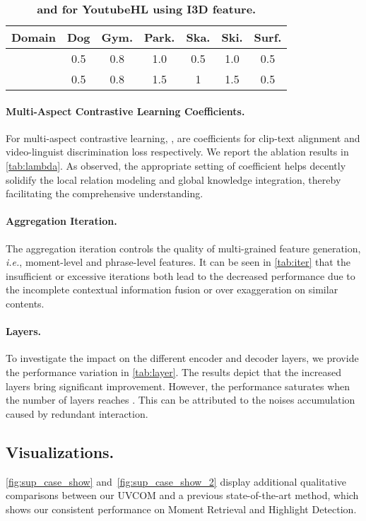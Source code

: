 \documentclass[10pt,twocolumn,letterpaper]{article}
\begin{document}
\begin{table*}[t]
\begin{minipage}[c]{\textwidth}
    \hspace{0.01\textwidth}
    \begin{minipage}{0.3\textwidth}
    \makeatletter{}
    \centering
    \footnotesize
    \vspace{10pt}
    \setlength{\tabcolsep}{2pt}
    \begin{tabular}{c | c c c c c c}
    \toprule
    Domain & Dog & Gym. & Park. & Ska. & Ski. & Surf. \\
    \midrule
     & 0.5 & 0.8 & 1.0 & 0.5 & 1.0 & 0.5 \\
    \midrule
     & 0.5 & 0.8 & 1.5 & 1 & 1.5 & 0.5 \\
    \bottomrule
    \end{tabular}
    \caption{\textbf{ and  for YoutubeHL using I3D feature.}}
    \label{tab:sup_youtubehl_i3d_loss}
    \end{minipage}
\end{minipage}
\end{table*} \paragraph{Multi-Aspect Contrastive Learning Coefficients.}
For multi-aspect contrastive learning, ,  are coefficients for clip-text alignment and video-linguist discrimination loss respectively. We report the ablation results in \cref{tab:lambda}. As observed, the appropriate setting of coefficient helps decently solidify the local relation modeling and global knowledge integration, thereby facilitating the comprehensive understanding. 

\paragraph{Aggregation Iteration.} The aggregation iteration controls the quality of multi-grained feature generation, \textit{i.e.}, moment-level and phrase-level features. It can be seen in \cref{tab:iter} that the insufficient or excessive iterations both lead to the decreased performance due to the incomplete contextual information fusion or over exaggeration on similar contents. 

\paragraph{Layers.} To investigate the impact on the different encoder and decoder layers, we provide the performance variation in \cref{tab:layer}. The results depict that the increased layers bring significant improvement. However, the performance saturates when the number of layers reaches . This can be attributed to the noises accumulation caused by redundant interaction.

\subsection{Visualizations.}
\cref{fig:sup_case_show} and~\cref{fig:sup_case_show_2} display additional qualitative comparisons between our UVCOM and a previous state-of-the-art method, which shows our consistent performance on Moment Retrieval and Highlight Detection. 
 
\end{document}
